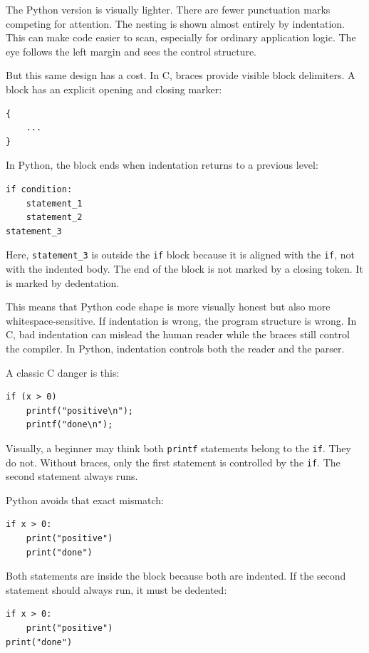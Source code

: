 The Python version is visually lighter. There are fewer punctuation marks competing for attention. The nesting is shown almost entirely by indentation. This can make code easier to scan, especially for ordinary application logic. The eye follows the left margin and sees the control structure.

But this same design has a cost. In C, braces provide visible block delimiters. A block has an explicit opening and closing marker:

\begin{verbatim}
{
    ...
}
\end{verbatim}

In Python, the block ends when indentation returns to a previous level:

\begin{verbatim}
if condition:
    statement_1
    statement_2
statement_3
\end{verbatim}

Here, \texttt{statement\_3} is outside the \texttt{if} block because it is aligned with the \texttt{if}, not with the indented body. The end of the block is not marked by a closing token. It is marked by dedentation.

This means that Python code shape is more visually honest but also more whitespace-sensitive. If indentation is wrong, the program structure is wrong. In C, bad indentation can mislead the human reader while the braces still control the compiler. In Python, indentation controls both the reader and the parser.

A classic C danger is this:

\begin{verbatim}
if (x > 0)
    printf("positive\n");
    printf("done\n");
\end{verbatim}

Visually, a beginner may think both \texttt{printf} statements belong to the \texttt{if}. They do not. Without braces, only the first statement is controlled by the \texttt{if}. The second statement always runs.

Python avoids that exact mismatch:

\begin{verbatim}
if x > 0:
    print("positive")
    print("done")
\end{verbatim}

Both statements are inside the block because both are indented. If the second statement should always run, it must be dedented:

\begin{verbatim}
if x > 0:
    print("positive")
print("done")
\end{verbatim}

